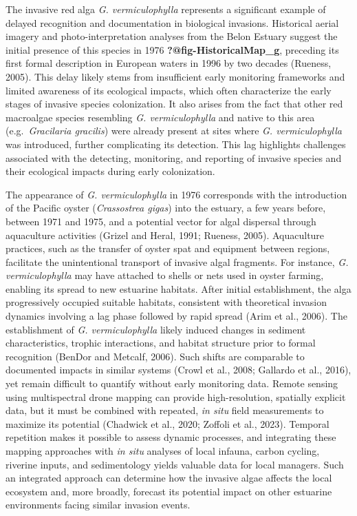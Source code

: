 \documentclass[
  letterpaper,
  11pt,
  english,
  singlespacing,
  headsepline]{MastersDoctoralThesis}
\begin{document}
\begin{spacing}{1.5}
The invasive red alga \emph{G. vermiculophylla} represents a significant
example of delayed recognition and documentation in biological
invasions. Historical aerial imagery and photo-interpretation analyses
from the Belon Estuary suggest the initial presence of this species in
1976 \textbf{?@fig-HistoricalMap\_g}, preceding its first formal
description in European waters in 1996 by two decades (Rueness, 2005).
This delay likely stems from insufficient early monitoring frameworks
and limited awareness of its ecological impacts, which often
characterize the early stages of invasive species colonization. It also
arises from the fact that other red macroalgae species resembling
\emph{G. vermiculophylla} and native to this area (e.g.~\emph{Gracilaria
gracilis}) were already present at sites where \emph{G. vermiculophylla}
was introduced, further complicating its detection. This lag highlights
challenges associated with the detecting, monitoring, and reporting of
invasive species and their ecological impacts during early colonization.

The appearance of \emph{G. vermiculophylla} in 1976 corresponds with the
introduction of the Pacific oyster (\emph{Crassostrea gigas}) into the
estuary, a few years before, between 1971 and 1975, and a potential
vector for algal dispersal through aquaculture activities (Grizel and
Heral, 1991; Rueness, 2005). Aquaculture practices, such as the transfer
of oyster spat and equipment between regions, facilitate the
unintentional transport of invasive algal fragments. For instance,
\emph{G. vermiculophylla} may have attached to shells or nets used in
oyster farming, enabling its spread to new estuarine habitats. After
initial establishment, the alga progressively occupied suitable
habitats, consistent with theoretical invasion dynamics involving a lag
phase followed by rapid spread (Arim et al., 2006). The establishment of
\emph{G. vermiculophylla} likely induced changes in sediment
characteristics, trophic interactions, and habitat structure prior to
formal recognition (BenDor and Metcalf, 2006). Such shifts are
comparable to documented impacts in similar systems (Crowl et al., 2008;
Gallardo et al., 2016), yet remain difficult to quantify without early
monitoring data. Remote sensing using multispectral drone mapping can
provide high-resolution, spatially explicit data, but it must be
combined with repeated, \emph{in situ} field measurements to maximize
its potential (Chadwick et al., 2020; Zoffoli et al., 2023). Temporal
repetition makes it possible to assess dynamic processes, and
integrating these mapping approaches with \emph{in situ} analyses of
local infauna, carbon cycling, riverine inputs, and sedimentology yields
valuable data for local managers. Such an integrated approach can
determine how the invasive algae affects the local ecosystem and, more
broadly, forecast its potential impact on other estuarine environments
facing similar invasion events.


\end{spacing}
\end{document}
